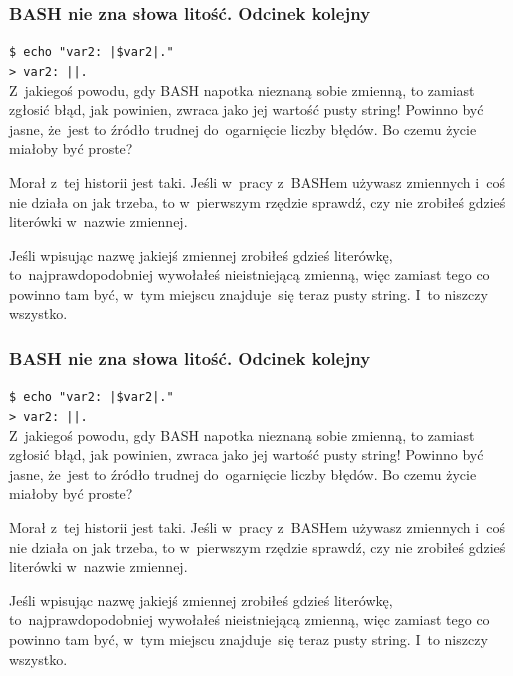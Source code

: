 \documentclass[10pt,t]{beamer}
\begin{document}
\begin{frame}
  \frametitle{BASH nie zna słowa litość. Odcinek kolejny}


  \texttt{\$ echo "var2: |\$var2|."} \\
  \texttt{> var2: ||.} \\
  Z~jakiegoś powodu, gdy BASH napotka nieznaną sobie zmienną, to
  \alert{zamiast} zgłosić błąd, jak powinien, zwraca jako jej wartość
  \alert{pusty string}! Powinno być jasne, że~jest to źródło trudnej
  do~ogarnięcie liczby błędów. Bo czemu życie miałoby być proste?

  Morał z~tej historii jest taki. Jeśli w~pracy z~BASHem używasz
  zmiennych i~coś nie działa on jak trzeba, to w~pierwszym rzędzie sprawdź,
  czy nie zrobiłeś gdzieś literówki w~nazwie zmiennej.

  Jeśli wpisując nazwę jakiejś zmiennej zrobiłeś gdzieś literówkę,
  to~najprawdopodobniej wywołałeś nieistniejącą zmienną, więc zamiast tego
  co powinno tam być, w~tym miejscu znajduje~się teraz pusty string.
  I~to niszczy wszystko.

\end{frame}





\begin{frame}
  \frametitle{BASH nie zna słowa litość. Odcinek kolejny}


  \texttt{\$ echo "var2: |\$var2|."} \\
  \texttt{> var2: ||.} \\
  Z~jakiegoś powodu, gdy BASH napotka nieznaną sobie zmienną, to
  \alert{zamiast} zgłosić błąd, jak powinien, zwraca jako jej wartość
  \alert{pusty string}! Powinno być jasne, że~jest to źródło trudnej
  do~ogarnięcie liczby błędów. Bo czemu życie miałoby być proste?

  Morał z~tej historii jest taki. Jeśli w~pracy z~BASHem używasz
  zmiennych i~coś nie działa on jak trzeba, to w~pierwszym rzędzie sprawdź,
  czy nie zrobiłeś gdzieś literówki w~nazwie zmiennej.

  Jeśli wpisując nazwę jakiejś zmiennej zrobiłeś gdzieś literówkę,
  to~najprawdopodobniej wywołałeś nieistniejącą zmienną, więc zamiast tego
  co powinno tam być, w~tym miejscu znajduje~się teraz pusty string.
  I~to niszczy wszystko.

\end{frame}
\end{document}
